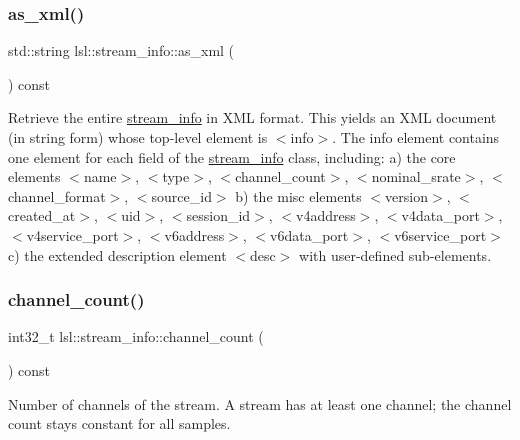 \subsubsection{\texorpdfstring{as\+\_\+xml()}{as\_xml()}}
{\footnotesize\ttfamily std\+::string lsl\+::stream\+\_\+info\+::as\+\_\+xml (\begin{DoxyParamCaption}{ }\end{DoxyParamCaption}) const\hspace{0.3cm}{\ttfamily [inline]}}

Retrieve the entire \hyperlink{classlsl_1_1stream__info}{stream\+\_\+info} in X\+ML format. This yields an X\+ML document (in string form) whose top-\/level element is $<$info$>$. The info element contains one element for each field of the \hyperlink{classlsl_1_1stream__info}{stream\+\_\+info} class, including\+: a) the core elements $<$name$>$, $<$type$>$, $<$channel\+\_\+count$>$, $<$nominal\+\_\+srate$>$, $<$channel\+\_\+format$>$, $<$source\+\_\+id$>$ b) the misc elements $<$version$>$, $<$created\+\_\+at$>$, $<$uid$>$, $<$session\+\_\+id$>$, $<$v4address$>$, $<$v4data\+\_\+port$>$, $<$v4service\+\_\+port$>$, $<$v6address$>$, $<$v6data\+\_\+port$>$, $<$v6service\+\_\+port$>$ c) the extended description element $<$desc$>$ with user-\/defined sub-\/elements. \mbox{\label{classlsl_1_1stream__info_acf09957c1c61a9d9e0f9439037eec305}} 
\subsubsection{\texorpdfstring{channel\+\_\+count()}{channel\_count()}}
{\footnotesize\ttfamily int32\+\_\+t lsl\+::stream\+\_\+info\+::channel\+\_\+count (\begin{DoxyParamCaption}{ }\end{DoxyParamCaption}) const\hspace{0.3cm}{\ttfamily [inline]}}

Number of channels of the stream. A stream has at least one channel; the channel count stays constant for all samples. \mbox{\label{classlsl_1_1stream__info_aa9695e52570e617d1c7dd4ea9f88b15d}} 
